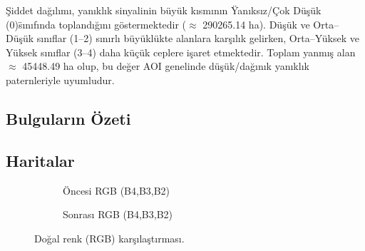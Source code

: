 \documentclass[11pt,a4paper]{article}
\begin{document}
\noindent Şiddet dağılımı, yanıklık sinyalinin büyük kısmının \"Yanıksız/Çok Düşük (0)\" sınıfında toplandığını göstermektedir ($\approx$ \num{290265.14} ha). Düşük ve Orta--Düşük sınıflar (1--2) sınırlı büyüklükte alanlara karşılık gelirken, Orta--Yüksek ve Yüksek sınıflar (3--4) daha küçük ceplere işaret etmektedir. Toplam yanmış alan $\approx$ \num{45448.49} ha olup, bu değer AOI genelinde düşük/dağınık yanıklık paternleriyle uyumludur.


\subsection*{Bulguların Özeti}
\begin{center}
\end{center}


\subsection{Haritalar}
\begin{figure}[H]
  \centering
  \begin{subfigure}[b]{0.48\textwidth}
    \centering
    \caption{Öncesi RGB (B4,B3,B2)}
  \end{subfigure}\hfill
  \begin{subfigure}[b]{0.48\textwidth}
    \centering
    \caption{Sonrası RGB (B4,B3,B2)}
  \end{subfigure}
  \caption{Doğal renk (RGB) karşılaştırması.}
  \label{fig:rgb}
\end{figure}
\FloatBarrier
\end{document}
